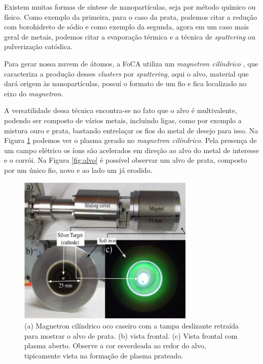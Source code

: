Existem muitas formas de síntese de nanopartículas, seja por método químico ou físico. Como exemplo da primeira, para o caso da prata, podemos citar a redução com borohidreto de sódio e como exemplo da segunda, agora em um caso mais geral de metais, podemos citar a evaporação térmica e a técnica de \textit{sputtering} ou pulverização catódica.

Para gerar nossa nuvem de átomos, a FoCA utiliza um \textit{magnetron cilíndrico} \cite{ref_artigo_foca}, que caracteriza a produção desses \textit{clusters} por \textit{sputtering}, aqui o alvo, material que dará origem às nanopartículas, possuí o formato de um fio e fica localizado no eixo do \textit{magnetron}.

A versatilidade dessa técnica encontra-se no fato que o alvo é multivalente, podendo ser composto de vários metais, incluindo ligas, como por exemplo a mistura ouro e prata, bastando entrelaçar os fios do metal de desejo para isso. Na Figura \ref{fig:magnetron} podemos ver o plasma gerado no \textit{magnetron cilíndrico}. Pela presença de um campo elétrico os íons são acelerados em direção ao alvo do metal de interesse e o corrói. Na Figura \ref{fig:alvo} é possível observar um alvo de prata, composto por um único fio, novo e ao lado um já erodido.

\begin{figure}
  \centering
  \includegraphics[width=0.75\textwidth]{images/foca/magnetron_cil}
  \caption{ (a) Magnetron cilíndrico oco caseiro com a tampa deslizante retraída para mostrar o alvo de prata. (b) vista frontal. (c) Vista frontal com plasma aberto. Observe a cor esverdeada ao redor do alvo, tipicamente vista na formação de plasma prateado.\cite{livro_vitor} }
  \label{fig:magnetron}  
\end{figure}


